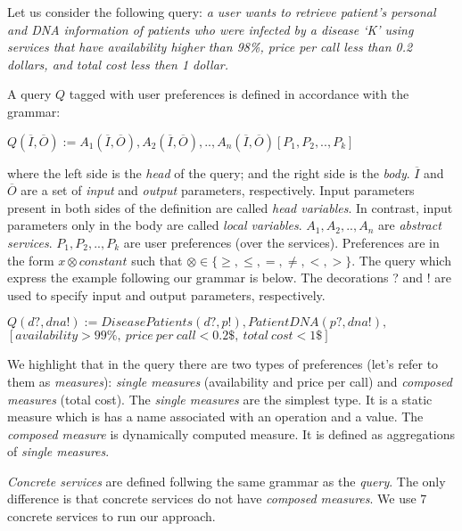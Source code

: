 Let us consider the following query: \textit{a user wants to retrieve patient's personal and DNA information of patients who were infected by a disease `K' using services that have availability higher than 98\%, price per call less than 0.2 dollars, and total cost less then 1 dollar.} 

A query $Q$ tagged with user preferences is defined in accordance with the grammar:
\begin{center}
$Q (\overline{I}, \overline{O}) := A_{1}(\overline{I}, \overline{O}), A_{2}(\overline{I}, \overline{O}), ..,  A_{n}(\overline{I}, \overline{O})[P_{1},P_{2}, .., P_{k}]$
\end{center}
where the left side is the \textit{head} of the query; and the right side is the \textit{body}. 
$\overline{I}$ and $\overline{O}$ are a set of \textit{input} and \textit{output} parameters, respectively.
Input parameters present in both sides of the definition are called \textit{head variables}.
In contrast, input parameters only in the body are called \textit{local variables}.
$A_{1}, A_{2}, .., A_{n}$ are \textit{abstract services}.
$P_{1}, P_{2}, .., P_{k}$ are user preferences (over the services). Preferences are in the form $x \otimes constant$ such that $\otimes \in\lbrace \geq, \leq, =, \neq, <, >\rbrace$.
The query which express the example following our grammar is below.
The decorations ? and ! are used to specify input and output parameters, respectively. 
\begin{small}
\begin{center}
$Q (d?, dna!) := DiseasePatients(d?, p!), PatientDNA(p?, dna!),$ \\
$[availability > 99\%, \ price \ per \ call < 0.2\$, \ total \ cost < 1\$]$
\end{center} 
\end{small}

We highlight that in the query there are two types of preferences (let's refer
to them as \textit{measures}): \textit{single measures} (availability and price per call) and \textit{composed measures} (total cost).
The \textit{single measures} are the simplest type. It is a static measure which is has a name associated with an operation and a value. The\textit{ composed measure} is dynamically computed measure. It is defined as aggregations of \textit{single measures}. 

\textit{Concrete services} are defined follwing the same grammar as the
\textit{query}. The only difference is that concrete services do not have
\textit{composed measures}. We use 7 concrete services to run our approach.

